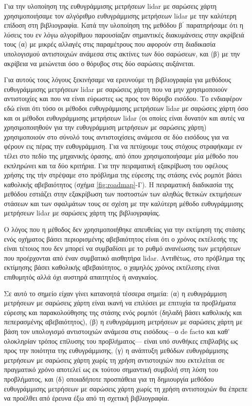 Για την υλοποίηση της ευθυγράμμισης μετρήσεων lidar με σαρώσεις χάρτη
χρησιμοποιήσαμε τον αλγόριθμο ευθυγράμμισης μετρήσεων lidar με την καλύτερη
επίδοση στη βιβλιογραφία. Κατά την υλοποίηση της μεθόδου β$^\prime$ παρατηρήσαμε
ότι η λύσεις του εν λόγω αλγορίθμου παρουσίαζαν σημαντικές διακυμάνσεις στην
ακρίβειά τους (α) με μικρές αλλαγές στις παραμέτρους που αφορούν στη διαδικασία
υπολογισμού αντιστοιχιών ανάμεσα στις ακτίνες των δύο σαρώσεων, και (β) με την
ακρίβεια να μειώνεται όσο ο θόρυβος στις δύο σαρώσεις αυξάνεται.

Για αυτούς τους λόγους ξεκινήσαμε να ερευνούμε τη βιβλιογραφία για μεθόδους
ευθυγράμμισης μετρήσεων lidar με σαρώσεις χάρτη που να μην χρησιμοποιούν
αντιστοιχίες και που να είναι εύρωστες ως προς τον θόρυβο εισόδου. Το
ενδιαφέρον εδώ είναι ότι τόσο οι μέθοδοι ευθυγράμμισης μετρήσεων lidar με
σαρώσεις χάρτη όσο και οι μέθοδοι ευθυγράμμισης μετρήσεων lidar (οι οποίες
είναι δυνατόν και αυτές να χρησιμοποιηθούν για την ευθυγράμμιση μετρήσεων με
σαρώσεις χάρτη) χρησιμοποιούν στο σύνολό τους αντιστοιχίσεις ανάμεσα σε δύο
εισόδους για να φέρουν εις πέρας την ευθυγράμμιση. Για να πετύχουμε τους
στόχους στραφήκαμε εν τέλει στο πεδίο της μηχανικής όρασης, από όπου
χρησιμοποιήσαμε μία μέθοδο που εκπληρώνει και τα δύο κριτήρια. Για την
πειραματική εξακρίβωση του οφέλους χρήσης της τήν στρέψαμε στο πρόβλημα της
εύρεσης της στάσης ενός ρομπότ βάσει καθολικής αβεβαιότητος (σχήμα
\ref{fig:roadmap}-Γ). Η πειραματική διαδικασία της μεθόδου εστιάζει στην
εξακρίβωση των ποστοστών των αληθώς θετικών εκτιμήσεων στάσεων και των
σφαλμάτων τους σε σχέση με την καλύτερη μέθοδο ευθυγράμμισης μετρήσεων lidar με
σαρώσεις χάρτη της βιβλιογραφίας.

Ο λόγος που η μέθοδος δεν χρησιμοποιήθηκε απευθείας για την εκτίμηση
της στάσης ενός οχήματος βάσει περιορισμένης αβεβαιότητος είναι ότι ο χρόνος
εκτέλεσής της είναι τέτοιος που δεν μπορεί να συμβαδίσει με το ρυθμό ανανέωσης
των μετρήσεων που προέρχονται από έναν συμβατικό αισθητήρα lidar. Αντιθέτως,
στο πρόβλημα της εκτίμησης βάσει καθολικής αβεβαιότητος, ο χαμηλός χρόνος
εκτέλεσης είναι επιθυμητός αλλά όχι αυστηρά απαιτητέος ή αναγκαίος.

Σε αυτό το σημείο είχαν γίνει κατανοητά τέσσερα σημεία: (α) η ευθυγράμμιση
μετρήσεων με σαρώσεις χάρτη είναι ικανή να επιλύσει με επιτυχία τα προβλήματα
εύρεσης και παρακολούθησης της στάσης ενός ρομπότ (δηλαδή βάσει καθολικής και
πεπερασμένης αβεβαιότητος), (β) η ευθυγράμμιση μετρήσεων με σαρώσεις χάρτη με
βάση τον υπολογισμό αντιστοιχιών ανάμεσα στις εισόδους---ο de factο και καθ'
ολοκληρίαν τρόπος επίλυσης του προβλήματος--- είναι υπό συνθήκες επιβλαβής ως
προς την ποιότητα της ευθυγράμμισης, (γ) η ανάπτυξη μεθόδων ευθυγράμμισης
μετρήσεων με σαρώσεις χάρτη χωρίς τη χρήση αντιστοιχιών που εκτελείται σε
πραγματικό χρόνο αποτελεί ως εκ τούτου σημαντική συμβολή στη λύση του
προβλήματος, και (δ) οποιαδήποτε προσπάθεια για τη δημιουργία μεθόδου
ευθυγράμμισης μετρήσεων με σαρώσεις χάρτη χωρίς τη χρήση αντιστοιχιών θα έπρεπε
να προέλθει από έρευνα έξω από τη σχετική βιβλιογραφία.


